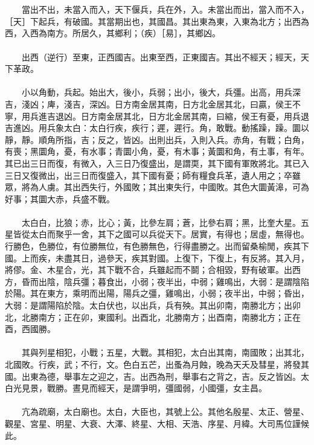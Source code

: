 \\\\
　　當出不出，未當入而入，天下偃兵，兵在外，入。未當出而出，當入而不入，［天］下起兵，有破國。其當期出也，其國昌。其出東為東，入東為北方；出西為西，入西為南方。所居久，其鄉利；（疾）［易］，其鄉凶。
\\\\
　　出西（逆行）至東，正西國吉。出東至西，正東國吉。其出不經天；經天，天下革政。
\\\\
　　小以角動，兵起。始出大，後小，兵弱；出小，後大，兵彊。出高，用兵深吉，淺凶；庳，淺吉，深凶。日方南金居其南，日方北金居其北，曰贏，侯王不寧，用兵進吉退凶。日方南金居其北，日方北金居其南，曰縮，侯王有憂，用兵退吉進凶。用兵象太白：太白行疾，疾行；遲，遲行。角，敢戰。動搖躁，躁。圜以靜，靜。順角所指，吉；反之，皆凶。出則出兵，入則入兵。赤角，有戰；白角，有喪；黑圜角，憂，有水事；青圜小角，憂，有木事；黃圜和角，有土事，有年。其已出三日而復，有微入，入三日乃復盛出，是謂耎，其下國有軍敗將北。其已入三日又復微出，出三日而復盛入，其下國有憂；師有糧食兵革，遺人用之；卒雖眾，將為人虜。其出西失行，外國敗；其出東失行，中國敗。其色大圜黃滜，可為好事；其圜大赤，兵盛不戰。
\\\\
　　太白白，比狼；赤，比心；黃，比參左肩；蒼，比參右肩；黑，比奎大星。五星皆從太白而聚乎一舍，其下之國可以兵從天下。居實，有得也；居虛，無得也。行勝色，色勝位，有位勝無位，有色勝無色，行得盡勝之。出而留桑榆閒，疾其下國。上而疾，未盡其日，過參天，疾其對國。上復下，下復上，有反將。其入月，將僇。金、木星合，光，其下戰不合，兵雖起而不鬬；合相毀，野有破軍。出西方，昏而出陰，陰兵彊；暮食出，小弱；夜半出，中弱；雞鳴出，大弱：是謂陰陷於陽。其在東方，乘明而出陽，陽兵之彊，雞鳴出，小弱；夜半出，中弱；昏出，大弱：是謂陽陷於陰。太白伏也，以出兵，兵有殃。其出卯南，南勝北方；出卯北，北勝南方；正在卯，東國利。出酉北，北勝南方；出酉南，南勝北方；正在酉，西國勝。
\\\\
　　其與列星相犯，小戰；五星，大戰。其相犯，太白出其南，南國敗；出其北，北國敗。行疾，武；不行，文。色白五芒，出蚤為月蝕，晚為天夭及彗星，將發其國。出東為德，舉事左之迎之，吉。出西為刑，舉事右之背之，吉。反之皆凶。太白光見景，戰勝。晝見而經天，是謂爭明，彊國弱，小國彊，女主昌。
\\\\
　　亢為疏廟，太白廟也。太白，大臣也，其號上公。其他名殷星、太正、營星、觀星、宮星、明星、大衰、大澤、終星、大相、天浩、序星、月緯。大司馬位謹候此。
\\\\
